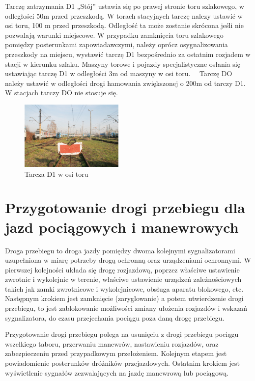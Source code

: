 Tarczę zatrzymania D1 „Stój” ustawia się po prawej stronie toru szlakowego, w odległości 50m przed przeszkodą. W torach stacyjnych tarczę nalezy ustawić w osi toru, 100 m przed przeszkodą. Odległość ta może zostanie skrócona jeśli nie pozwalają warunki miejscowe. W przypadku zamknięcia toru szlakowego pomiędzy posterunkami zapowiadawczymi, należy oprócz osygnalizowania przeszkody na miejscu, wystawić tarczę D1 bezpośrednio za ostatnim rozjadem w stacji w kierunku szlaku. Maszyny torowe i pojazdy specjalistyczne osłania się ustawiając tarczę D1 w odległości 3m od maszyny w osi toru.
\ \ Tarczę DO należy ustawić w odległości drogi hamowania zwiększonej o 200m od tarczy D1. W stacjach tarczy DO nie stosuje się.
	\begin{figure}
	\includegraphics[width=0.45\textwidth]{skryptkierownik-img/skryptkierownik-img023.jpg}
	\caption{Tarcza D1 w osi toru}
\end{figure}

\chapter{Przygotowanie drogi przebiegu dla jazd pociągowych i manewrowych}


Droga przebiegu to droga jazdy pomiędzy dwoma kolejnymi sygnalizatorami uzupełniona w miarę potrzeby drogą ochronną oraz urządzeniami ochronnymi. W pierwszej kolejności układa się drogę rozjazdową, poprzez właściwe ustawienie zwrotnic i wykolejnic w terenie, właściwe ustawienie urządzeń zależnościowych takich jak zamki zwrotnicowe i wykolejnicowe, obsługa aparatu blokowego, etc. Następnym krokiem jest zamknięcie (zaryglowanie) a potem utwierdzenie drogi przebiegu, to jest zablokowanie możliwości zmiany ułożenia rozjazdów i wskazań sygnalizatora, do czasu przejechania pociągu poza daną drogę przebiegu.

Przygotowanie drogi przebiegu polega na usunięciu z drogi przebiegu pociągu wszelkiego taboru, przerwaniu manewrów, nastawieniu rozjazdów, oraz zabezpieczeniu przed przypadkowym przełożeniem. Kolejnym etapem jest powiadomienie posterunków dróżników przejazdowych. Ostatnim krokiem jest wyświetlenie sygnałów zezwalających na jazdę manewrową lub pociągową.

